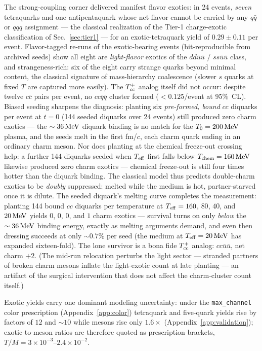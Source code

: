 The strong-coupling corner delivered manifest flavor exotics: in 24
events, \emph{seven} tetraquarks and one antipentaquark whose net
flavor cannot be carried by any $q\bar q$ or $qqq$ assignment --- the
classical realization of the Tier-1 charge-exotic classification of
Sec.~\ref{sec:tier1} --- for an exotic-tetraquark yield of
$0.29\pm0.11$ per event.  Flavor-tagged re-runs of the exotic-bearing
events (bit-reproducible from archived seeds) show all eight are
\emph{light-flavor} exotics of the $dd\bar u\bar u$ / $ss\bar u\bar u$
class, and strangeness-rich: six of the eight carry strange quarks
beyond minimal content, the classical signature of mass-hierarchy
coalescence (slower $s$ quarks at fixed $T$ are captured more easily).
The $T_{cc}^{+}$ analog itself did not occur: despite twelve $c\bar c$ pairs
per event, no $cc\bar q\bar q$ cluster formed
($<0.125$/event at 95\%~CL).  Biased seeding sharpens the diagnosis:
planting six \emph{pre-formed, bound} $cc$ diquarks per event at $t=0$
(144 seeded diquarks over 24 events) still produced zero charm
exotics --- the $\sim36\,\mathrm{MeV}$ diquark binding is no match for the
$T_0=200\,\mathrm{MeV}$ plasma, and the seeds melt in the first fm/$c$, each
charm quark ending in an ordinary charm meson.  Nor does planting at
the chemical freeze-out crossing help: a further 144 diquarks seeded
when $T_{\mathrm{eff}}$ first falls below $T_{\mathrm{chem}}=160\,\mathrm{MeV}$ likewise produced
zero charm exotics --- chemical freeze-out is still four times hotter
than the diquark binding.  The classical model thus predicts
double-charm exotics to be \emph{doubly} suppressed: melted while the
medium is hot, partner-starved once it is dilute.  The seeded
diquark's melting curve completes the measurement: planting 144 bound
$cc$ diquarks per temperature at $T_{\mathrm{eff}} = 160$, $80$, $40$, and
$20\,\mathrm{MeV}$ yields $0$, $0$, $0$, and $1$ charm exotics --- survival
turns on only \emph{below} the $\sim36\,\mathrm{MeV}$ binding energy, exactly
as melting arguments demand, and even then dressing succeeds at only
$\sim0.7\%$ per seed (the medium at $T_{\mathrm{eff}}=20\,\mathrm{MeV}$ has expanded
sixteen-fold).  The lone survivor is a bona fide $T_{cc}^{+}$ analog:
$cc\bar u\bar u$, net charm $+2$.  (The mid-run relocation perturbs
the light sector --- stranded partners of broken charm mesons inflate
the light-exotic count at late planting --- an artifact of the
surgical intervention that does not affect the charm-cluster count
itself.)

Exotic yields carry one dominant modeling uncertainty: under the
\texttt{max\_channel} color prescription (Appendix~\ref{app:color})
tetraquark and five-quark yields rise by factors of $12$ and $\sim10$
while mesons rise only $1.6\times$
(Appendix~\ref{app:validation}); exotic-to-meson ratios are therefore
quoted as prescription brackets, $T/M = 3\times10^{-3}$--$2.4\times
10^{-2}$.

